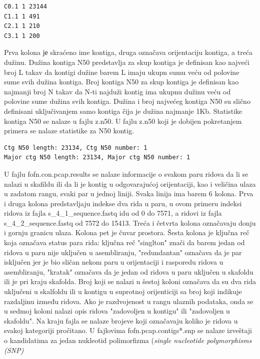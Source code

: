 \documentclass[a4paper]{article}
\begin{document}
{\begin{verbatim}
C0.1 1 23144 
C1.1 1 491 
C2.1 1 210 
C3.1 1 200 
\end{verbatim}
Prva kolona је skraćeno ime kontiga, druga označava orijentaciju kontiga, a treća dužinu. Dužina kontiga N50 predstavlja za skup kontiga je definisan kao najveći broj L takav da kontigi dužine barem L imaju ukupn sumu veću od polovine sume svih dužina kontiga. Broj kontiga N50 za skup kontiga je definisan kao najmanji broj N takav da N-ti najduži kontig ima ukupnu dužinu veću od polovine sume dužina svih kontiga. Dužina i broj najvećeg kontiga N50 su slično definisani uključivanjem samo kontiga čija je dužina najmanje 1Kb. Statistike kontiga N50 se nalaze u fajlu z.n50. U fajlu z.n50 koji je dobijen pokretanjem primera se nalaze statistike za N50 kontig.
\begin{verbatim}
Ctg N50 length: 23134, Ctg N50 number: 1
Major ctg N50 length: 23134, Major ctg N50 number: 1
\end{verbatim}

U fajlu fofn.con.pcap.results se nalaze informacije o svakom paru ridova da li se nalazi u skafildu ili da li je kontig u odgovarajućoj orijentaciji, kao i veličina ulaza u zadatom rangu, svaki par u jednoj liniji. Svaka linija ima barem 6 kolona. Prva i druga kolona predstavljaju indekse dva rida u paru, u ovom primeru indeksi ridova iz fajla s\_4\_1\_sequence.fastq idu od 0 do 7571, a ridovi iz fajla s\_4\_2\_sequence.fastq  od 7572 do 15413. Treća i četvrta kolona označavaju donju i gornju granicu ulaza. Kolona pet je čuvar prostora. Šesta kolona je ključna reč koja označava status para rida: ključna reč "singlton" znači da barem jedan od ridova u paru nije uključen u asembliranju, "redundantan" označava da je par isključen jer je bio sličan nekom paru u orijentaciji i rasporedu ridova u asembliranju, "kratak" označava da je jedan od ridova u paru uključen u skafoldu ili je pri kraju skafolda. Broj koji se nalazi u šestoj koloni označava da su dva rida uključeni u skalfoldu ili u kontigu u suprotnoj orijenticiji sa broj koji indikuje razdaljinu između ridova. Ako je razdvojenost u rangu ulaznih podataka, onda se u sedmoj koloni nalazi opis ridova "zadovoljen u kontigu" ili "zadovoljen u skafoldu". Na kraju fajla se nalaze brojeve koji označavaju koliko je ridova u svakoj kategoriji pročitano. U fajlovima fofn.pcap.contigs*.snp se nalaze izveštaji o kandidatima za jedan nukleotid polimorfizma (\textit{single nucleotide polymorphisms (SNP)}
 
}
\end{document}

